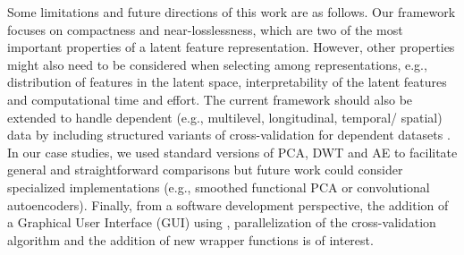 Some limitations and future directions of this work are as follows.
Our framework focuses on compactness and near-losslessness, which are two of the most important properties of a latent feature representation.
However, other properties might also need to be considered when selecting among representations, e.g., distribution of features in the latent space, interpretability of the latent features and computational time and effort.
The current framework should also be extended to handle dependent (e.g., multilevel, longitudinal, temporal/ spatial) data by including structured variants of cross-validation for dependent datasets
\parencite{bergmeir_note_2018, hornung_evaluating_2023, roberts_cross-validation_2017}.
In our case studies, we used standard versions of PCA, DWT and AE to facilitate general and straightforward comparisons but future work could consider specialized implementations (e.g., smoothed functional PCA or convolutional autoencoders). 
Finally, from a software development perspective, the addition of a Graphical User Interface (GUI) using  \parencite{chang_shiny_2021}, parallelization of the cross-validation algorithm and the addition of new wrapper functions is of interest.



